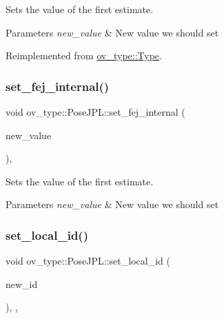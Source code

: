 Sets the value of the first estimate. 


\begin{DoxyParams}{Parameters}
{\em new\+\_\+value} & New value we should set \\
\hline
\end{DoxyParams}


Reimplemented from \hyperlink{classov__type_1_1Type_ab8345946b27cb43e0cfc36454a06686d}{ov\+\_\+type\+::\+Type}.

\mbox{\label{classov__type_1_1PoseJPL_a779b5bce92981b57b018ab5c14cf4b99}} 
\subsubsection{\texorpdfstring{set\+\_\+fej\+\_\+internal()}{set\_fej\_internal()}}
{\footnotesize\ttfamily void ov\+\_\+type\+::\+Pose\+J\+P\+L\+::set\+\_\+fej\+\_\+internal (\begin{DoxyParamCaption}\item[{const Eigen\+::\+Matrix\+Xd \&}]{new\+\_\+value }\end{DoxyParamCaption})\hspace{0.3cm}{\ttfamily [inline]}, {\ttfamily [protected]}}



Sets the value of the first estimate. 


\begin{DoxyParams}{Parameters}
{\em new\+\_\+value} & New value we should set \\
\hline
\end{DoxyParams}
\mbox{\label{classov__type_1_1PoseJPL_a2295d3fbdd9529c1464957961a886731}} 
\subsubsection{\texorpdfstring{set\+\_\+local\+\_\+id()}{set\_local\_id()}}
{\footnotesize\ttfamily void ov\+\_\+type\+::\+Pose\+J\+P\+L\+::set\+\_\+local\+\_\+id (\begin{DoxyParamCaption}\item[{int}]{new\+\_\+id }\end{DoxyParamCaption})\hspace{0.3cm}{\ttfamily [inline]}, {\ttfamily [override]}, {\ttfamily [virtual]}}



